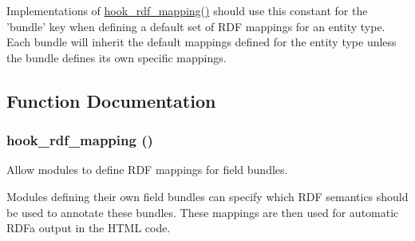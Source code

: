 Implementations of \hyperlink{group__rdf_gae3e7f047bdcb9309b323e2af09966765}{hook\_\-rdf\_\-mapping()} should use this constant for the 'bundle' key when defining a default set of RDF mappings for an entity type. Each bundle will inherit the default mappings defined for the entity type unless the bundle defines its own specific mappings. 

\subsection{Function Documentation}
\hypertarget{group__rdf_gae3e7f047bdcb9309b323e2af09966765}{
\subsubsection[{hook\_\-rdf\_\-mapping}]{\setlength{\rightskip}{0pt plus 5cm}hook\_\-rdf\_\-mapping ()}}
\label{group__rdf_gae3e7f047bdcb9309b323e2af09966765}
Allow modules to define RDF mappings for field bundles.

Modules defining their own field bundles can specify which RDF semantics should be used to annotate these bundles. These mappings are then used for automatic RDFa output in the HTML code.

